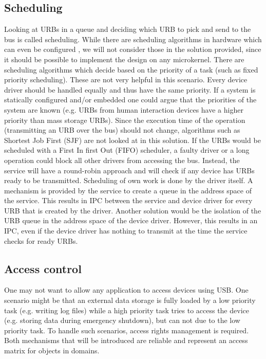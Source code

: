 \documentclass{acm_proc_article-sp}
\begin{document}
\subsection{Scheduling}
Looking at URBs in a queue and deciding which URB to pick and send to the bus is called
scheduling.
While there are scheduling algorithms in hardware which can even be configured \cite{chs-ERSA03},
we will not consider those in the solution provided, since it should be possible to implement
the design on any microkernel.
There are scheduling algorithms which decide based on the priority of a task (such as fixed
priority scheduling).
These are not very helpful in this scenario.
Every device driver should be handled equally and thus have the same priority.
If a system is statically configured and/or embedded one could argue that the priorities of
the system are known (e.g. URBs from human interaction devices have a higher priority than
mass storage URBs).
Since the execution time of the operation (transmitting an URB over the bus) should not change,
algorithms such as Shortest Job First (SJF) are not looked at in this solution.
If the URBs would be scheduled with a First In first Out (FIFO) scheduler, a faulty driver
or a long operation could block all other drivers from accessing the bus.
Instead, the service will have a round-robin approach and will check if any device has URBs
ready to be transmitted.
Scheduling of own work is done by the driver itself.
A mechanism is provided by the service to create a queue in the address space of the service.
This results in IPC between the service and device driver for every URB that is created by
the driver.
Another solution would be the isolation of the URB queue in the address space of the device
driver.
However, this results in an IPC, even if the device driver has nothing to transmit at the
time the service checks for ready URBs.

\subsection{Access control}
One may not want to allow any application to access devices using USB.
One scenario might be that an external data storage is fully loaded by a low priority
task (e.g. writing log files) while a high priority task tries to access the device (e.g. storing
data during emergency shutdown), but can not due to the low priority task.
To handle such scenarios, access rights management is required.
Both mechanisms that will be introduced are reliable and represent an access matrix
for objects in domains.
\end{document}
